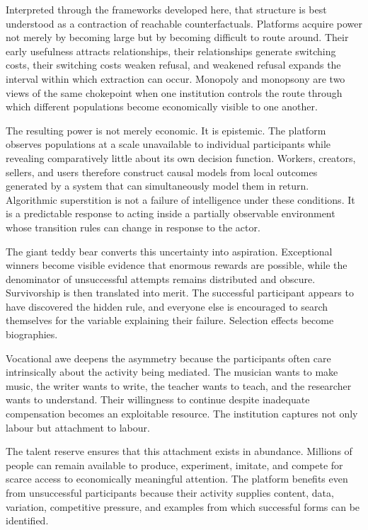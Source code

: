 \documentclass[11pt]{article}
\begin{document}
Interpreted through the frameworks developed here, that structure is best understood as a contraction of reachable counterfactuals. Platforms acquire power not merely by becoming large but by becoming difficult to route around. Their early usefulness attracts relationships, their relationships generate switching costs, their switching costs weaken refusal, and weakened refusal expands the interval within which extraction can occur. Monopoly and monopsony are two views of the same chokepoint when one institution controls the route through which different populations become economically visible to one another.

The resulting power is not merely economic. It is epistemic. The platform observes populations at a scale unavailable to individual participants while revealing comparatively little about its own decision function. Workers, creators, sellers, and users therefore construct causal models from local outcomes generated by a system that can simultaneously model them in return. Algorithmic superstition is not a failure of intelligence under these conditions. It is a predictable response to acting inside a partially observable environment whose transition rules can change in response to the actor.

The giant teddy bear converts this uncertainty into aspiration. Exceptional winners become visible evidence that enormous rewards are possible, while the denominator of unsuccessful attempts remains distributed and obscure. Survivorship is then translated into merit. The successful participant appears to have discovered the hidden rule, and everyone else is encouraged to search themselves for the variable explaining their failure. Selection effects become biographies.

Vocational awe deepens the asymmetry because the participants often care intrinsically about the activity being mediated. The musician wants to make music, the writer wants to write, the teacher wants to teach, and the researcher wants to understand. Their willingness to continue despite inadequate compensation becomes an exploitable resource. The institution captures not only labour but attachment to labour.

The talent reserve ensures that this attachment exists in abundance. Millions of people can remain available to produce, experiment, imitate, and compete for scarce access to economically meaningful attention. The platform benefits even from unsuccessful participants because their activity supplies content, data, variation, competitive pressure, and examples from which successful forms can be identified.
\end{document}
